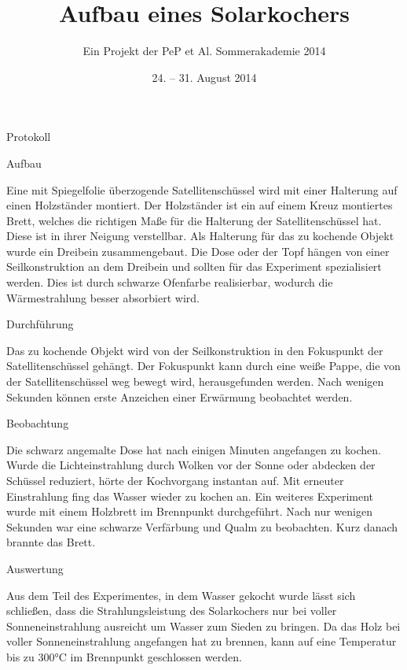 

\title{Aufbau eines Solarkochers}
\subtitle{Ein Projekt der PeP et Al. Sommerakademie 2014}
\date{24. -- 31. August 2014}

\author{

}


\maketitle
\tableofcontents

Protokoll

Aufbau

Eine mit Spiegelfolie überzogende Satellitenschüssel wird mit einer Halterung auf einen Holzständer montiert. Der Holzständer ist ein auf einem Kreuz montiertes Brett, welches die richtigen Maße für die Halterung der Satellitenschüssel hat. Diese ist in ihrer Neigung verstellbar. Als Halterung für das zu kochende Objekt wurde ein Dreibein zusammengebaut. Die Dose oder der Topf hängen von einer Seilkonstruktion an dem Dreibein und sollten für das Experiment spezialisiert werden. Dies ist durch schwarze Ofenfarbe realisierbar, wodurch die Wärmestrahlung besser absorbiert wird. 


Durchführung

Das zu kochende Objekt wird von der Seilkonstruktion in den Fokuspunkt der Satellitenschüssel gehängt. Der Fokuspunkt kann durch eine weiße Pappe, die von der Satellitenschüssel weg bewegt wird, herausgefunden werden. Nach wenigen Sekunden können erste Anzeichen einer Erwärmung beobachtet werden.


Beobachtung

Die schwarz angemalte Dose hat nach einigen Minuten angefangen zu kochen. Wurde die Lichteinstrahlung durch Wolken vor der Sonne oder abdecken der Schüssel reduziert, hörte der Kochvorgang instantan auf. Mit erneuter Einstrahlung fing das Wasser wieder zu kochen an. 
Ein weiteres Experiment wurde mit einem Holzbrett im Brennpunkt durchgeführt. Nach nur wenigen Sekunden war eine schwarze Verfärbung und Qualm zu beobachten. Kurz danach brannte das Brett.



Auswertung

Aus dem Teil des Experimentes, in dem Wasser gekocht wurde lässt sich schließen, dass die Strahlungsleistung des Solarkochers nur bei voller Sonneneinstrahlung ausreicht um Wasser zum Sieden zu bringen.
Da das Holz bei voller Sonneneinstrahlung angefangen hat zu brennen, kann auf eine Temperatur bis zu 300°C im Brennpunkt geschlossen werden.

